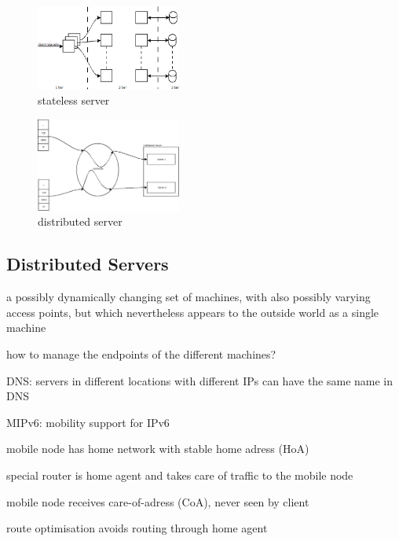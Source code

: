 \begin{minipage}{\linewidth}
      \centering
      \begin{minipage}{0.45\linewidth}
          \begin{figure}[H]
	\includegraphics[width=180px]{gfx/server3.png}
	\caption{stateless server}
	\label{img:statel_serv}
          \end{figure}
      \end{minipage}
      \vline
      \hspace{0.05\linewidth}
      \begin{minipage}{0.45\linewidth}
          \begin{figure}[H]
	\includegraphics[width=180px]{gfx/distrb_server.png}
	\caption{distributed server}
	\label{img:distrb_serv}
          \end{figure}
      \end{minipage}
\end{minipage}

\subsection{Distributed Servers}

\begin{compactitem}
	\item a possibly dynamically changing set of machines, with also possibly varying access points, but which nevertheless appears to the outside world as a single machine
	\item how to manage the endpoints of the different machines?
	\begin{compactenum}
		\item DNS: servers in different locations with different IPs can have the same name in DNS
		\item MIPv6: mobility support for IPv6
		\begin{compactitem}
			\item mobile node has home network with stable home adress (HoA)
			\item special router is home agent and takes care of traffic to the mobile node
			\item mobile node receives care-of-adress (CoA), never seen by client
			\item route optimisation avoids routing through home agent		
		\end{compactitem}
	\end{compactenum}
\end{compactitem}


